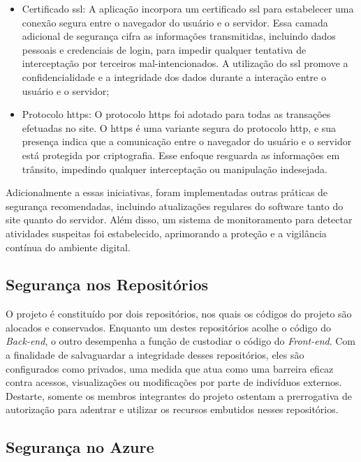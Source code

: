 \begin{itemize}
    \item Certificado \ac{ssl}: A aplicação incorpora um certificado \ac{ssl} para estabelecer uma conexão segura entre o navegador do usuário e o servidor. Essa camada adicional de segurança cifra as informações transmitidas, incluindo dados pessoais e credenciais de login, para impedir qualquer tentativa de interceptação por terceiros mal-intencionados. A utilização do \ac{ssl} promove a confidencialidade e a integridade dos dados durante a interação entre o usuário e o servidor;
\end{itemize}

\begin{itemize}
    \item Protocolo \ac{https}: O protocolo \ac{https} foi adotado para todas as transações efetuadas no site. O \ac{https} é uma variante segura do protocolo \ac{http}, e sua presença indica que a comunicação entre o navegador do usuário e o servidor está protegida por criptografia. Esse enfoque resguarda as informações em trânsito, impedindo qualquer interceptação ou manipulação indesejada.
\end{itemize}

Adicionalmente a essas iniciativas, foram implementadas outras práticas de segurança recomendadas, incluindo atualizações regulares do software tanto do site quanto do servidor. Além disso, um sistema de monitoramento para detectar atividades suspeitas foi estabelecido, aprimorando a proteção e a vigilância contínua do ambiente digital.

\subsection{Segurança nos Repositórios}

O projeto é constituído por dois repositórios, nos quais os códigos do projeto são alocados e conservados. Enquanto um destes repositórios acolhe o código do \textit{\gls{Back-end}}, o outro desempenha a função de custodiar o código do \textit{\gls{Front-end}}. Com a finalidade de salvaguardar a integridade desses repositórios, eles são configurados como privados, uma medida que atua como uma barreira eficaz contra acessos, visualizações ou modificações por parte de indivíduos externos. Destarte, somente os membros integrantes do projeto ostentam a prerrogativa de autorização para adentrar e utilizar os recursos embutidos nesses repositórios.

\subsection{Segurança no Azure}

